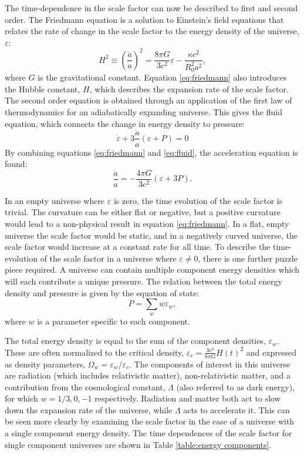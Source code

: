 The time-dependence in the scale factor can now be described to first and second order. The Friedmann equation is a solution to Einstein's field equations that relates the rate of change in the scale factor to the energy density of the universe, $\varepsilon$:
\begin{equation}\label{eq:friedmann}
H^2 \equiv \left( \frac{\dot{a}}{a} \right)^2 = \frac{8\pi G}{3c^2}\varepsilon - \frac{\kappa c^2}{R_{0}^{2}a^2},
\end{equation}
where $G$ is the gravitational constant. Equation \ref{eq:friedmann} also introduces the Hubble constant, $H$, which describes the expansion rate of the scale factor. The second order equation is obtained through an application of the first law of thermodynamics for an adiabatically expanding universe. This gives the fluid equation, which connects the change in energy density to pressure:
\begin{equation}\label{eq:fluid}
\dot{\varepsilon} + 3 \frac{\dot{a}}{a}(\varepsilon +P)=0 
\end{equation}
By combining equations \ref{eq:friedmann} and \ref{eq:fluid}, the acceleration equation is found:
\begin{equation}\label{eq:accel}
\frac{\ddot{a}}{a} =  -\frac{4\pi G}{3c^2}(\varepsilon+3P).
\end{equation}

In an empty universe where $\varepsilon$ is zero, the time evolution of the scale factor is trivial. The curvature can be either flat or negative, but a positive curvature would lead to a non-physical result in equation \ref{eq:friedmann}. In a flat, empty universe the scale factor would be static, and in a negatively curved universe, the scale factor would increase at a constant rate for all time. To describe the time-evolution of the scale factor in a universe where $\varepsilon \neq 0$, there is one further puzzle piece required. A universe can contain multiple component energy densities which will each contribute a unique pressure. The relation between the total energy density and pressure is given by the equation of state:
\begin{equation}
P= \sum_w w\varepsilon_w,
\end{equation}
where $w$ is a parameter specific to each component.

The total energy density is equal to the sum of the component densities, $\varepsilon_{w}$. These are often normalized to the critical density, $\varepsilon_{c} = \frac{3c^2}{8\pi G}H(t)^2$ and expressed as density parameters, $\Omega_{w}=\varepsilon_{w}/\varepsilon_{c}$. The components of interest in this universe are radiation (which includes relativistic matter), non-relativistic matter, and a contribution from the cosmological constant, $\Lambda$ (also referred to as dark energy), for which $w = 1/3, 0, -1$ respectively. Radiation and matter both act to slow down the expansion rate of the universe, while $\Lambda$ acts to accelerate it. This can be seen more clearly by examining the scale factor in the case of a universe with a single component energy density. The time dependences of the scale factor for single component universes are shown in Table \ref{table:energy components}.


